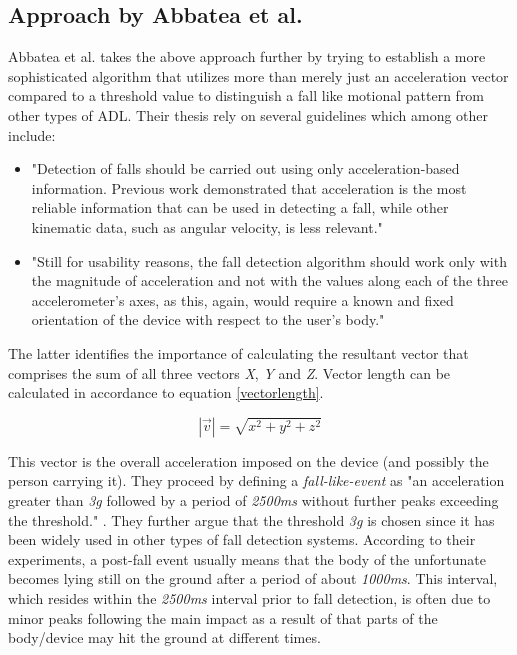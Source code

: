 \documentclass[12pt, a4paper, onecolumn]{article}
\begin{document}
	\subsection{Approach by Abbatea et al.}
	Abbatea et al. takes the above approach further by trying to establish a more sophisticated algorithm that utilizes more than merely just an acceleration vector compared to a threshold value to distinguish a fall like motional pattern from other types of ADL. Their thesis rely on several guidelines which among other include: 
	\begin{itemize} 
		\item "Detection of falls should be carried out using only acceleration-based information. Previous work demonstrated that acceleration is the most reliable information that can be used in detecting a fall, while other kinematic data, such as angular velocity, is less relevant." \cite[p~3]{piza_uni}
		
		\item "Still for usability reasons, the fall detection algorithm should work only with the magnitude of acceleration and not with the values along each of the three accelerometer’s axes, as this, again, would require a known and fixed orientation of the device with respect to the user’s body." \cite[p~3]{piza_uni}
	\end{itemize}
	
	The latter identifies the importance of calculating the resultant vector that comprises the sum of all three vectors \textit{X}, \textit{Y} and \textit{Z}. Vector length can be calculated in accordance to equation \ref{vectorlength}.
	
	\begin{equation}
	\label{vectorlength}
	|\vec{v}|=\sqrt{x^2+y^2+z^2}
	\end{equation}
	
	This vector is the overall acceleration imposed on the device (and possibly the person carrying it). They proceed by defining a \textit{fall-like-event} as "an acceleration greater than \textit{3g} followed by a period of \textit{2500ms} without further peaks exceeding the threshold." \cite[p~5]{piza_uni}. They further argue that the threshold \textit{3g} is chosen since it has been widely used in other types of fall detection systems. According to their experiments, a post-fall event usually means that the body of the unfortunate becomes lying still on the ground after a period of about \textit{1000ms}. This interval, which resides within the \textit{2500ms} interval prior to fall detection, is often due to minor peaks following the main impact as a result of that parts of the body/device may hit the ground at different times. 
	
\end{document}
